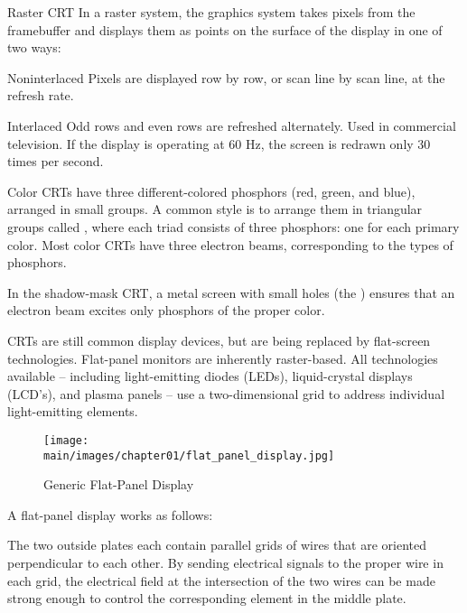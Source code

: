 \documentclass[\main/notes.tex]{subfiles}
\begin{document}
        \begin{definition}{Raster CRT}
          In a raster system, the graphics system takes pixels from the framebuffer and
          displays them as points on the surface of the display in one of two ways:
          \begin{descriptimize}[nosep]
            \item[Noninterlaced] Pixels are displayed row by row,
            or scan line by scan line, at the refresh rate.
            \item[Interlaced] Odd rows and even rows are refreshed alternately.
            Used in commercial television.
            If the display is operating at 60 Hz, the screen is redrawn only 30 times per second.
          \end{descriptimize}
        \end{definition}

        Color CRTs have three different-colored phosphors (red, green, and blue),
        arranged in small groups.
        A common style is to arrange them in triangular groups called ,
        where each triad consists of three phosphors: one for each primary color.
        Most color CRTs have three electron beams, corresponding to the types of phosphors.

        In the shadow-mask CRT, a metal screen with small holes (the )
        ensures that an electron beam excites only phosphors of the proper color.

        CRTs are still common display devices, but are being replaced by flat-screen technologies.
        Flat-panel monitors are inherently raster-based.
        All technologies available -- including light-emitting diodes (LEDs),
        liquid-crystal displays (LCD's), and plasma panels --
        use a two-dimensional grid to address individual light-emitting elements.
        \pagebreak

        \begin{wrapfigure}{l}{0.5\textwidth}
          \begin{center}
            \texttt{[image: \\main/images/chapter01/flat\_panel\_display.jpg]}
          \end{center}
          \caption{Generic Flat-Panel Display}
        \end{wrapfigure}

        A flat-panel display works as follows:

        The two outside plates each contain parallel grids of wires that are oriented perpendicular
        to each other.
        By sending electrical signals to the proper wire in each grid,
        the electrical field at the intersection of the two wires
        can be made strong enough to control the corresponding element in the middle plate.
\end{document}
